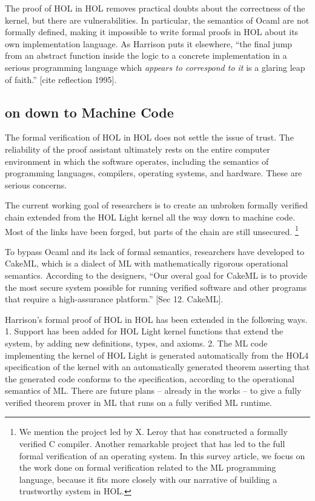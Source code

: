 \documentclass[brochure,english,12pt]{bourbaki}
\theoremstyle{plain}
\begin{document}
The proof of HOL in HOL removes practical doubts about the correctness of the kernel, but there
are vulnerabilities.  In particular, the semantics of Ocaml are not formally defined, making it impossible to write formal proofs in
HOL about its own implementation language.
As Harrison puts it elsewhere, ``the final jump from an abstract function inside the logic to a 
concrete implementation in a serious programming language which {\it appears to correspond to it} is a glaring leap of faith.'' 
[cite reflection 1995].  



\subsection{on down to Machine Code}

The formal verification of HOL in HOL does not settle the issue of trust.  
The reliability of the proof assistant ultimately
rests on the entire computer environment in which the software operates, including the semantics of programming languages,
compilers, operating systems, and hardware.  These are serious concerns.


 The current working goal of researchers is to create an unbroken formally verified chain extended from the
HOL Light kernel all the way down to machine code.  Most of the links have been forged, but parts of the chain
are still unsecured.  
\footnote{We mention the project led by X. Leroy that has constructed a formally verified C compiler. Another remarkable
project that has led to the full formal verification of an operating system.  In this survey article,
we focus on the work done on formal verification related to the ML programming language, because it fits more closely
with our narrative of building a trustworthy system in HOL.}

To bypass Ocaml and its lack of formal semantics, researchers have developed to CakeML, which
is a dialect of ML with mathematically rigorous operational semantics.  According to the designers, ``Our overal goal for CakeML
is to provide the most secure system possible for running verified software and other programs that require a high-assurance
platform.'' [Sec 12. CakeML].  

Harrison's formal proof of HOL in HOL has been extended in the following ways.  1.  Support has been added for 
HOL Light kernel functions that extend the system, by adding new definitions, types, and axioms.
2.  The ML code implementing the kernel of HOL Light is generated automatically from the HOL4 specification of the kernel with
an automatically generated theorem asserting that the generated code conforms to the specification, according to the operational
semantics of ML.
There are future plans -- already in the works --
to give a fully verified theorem prover in ML that runs on a fully verified ML runtime.
\end{document}

